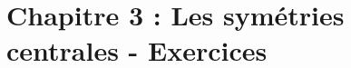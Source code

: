 

\newpage

\section*{Chapitre 3 : Les symétries centrales - Exercices}









\newpage
\setcounter{exrcntr}{0}









